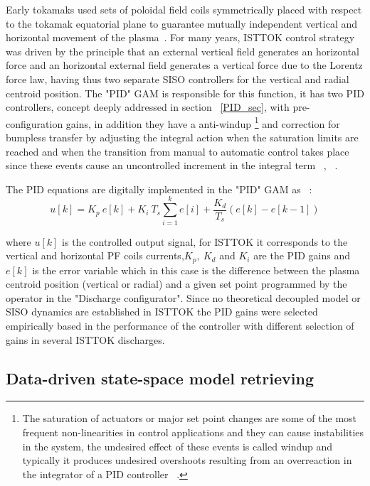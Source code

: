 Early tokamaks used sets of poloidal field coils symmetrically placed with respect to the tokamak equatorial plane to guarantee mutually independent vertical and horizontal movement of the plasma~\cite[Chapter~1]{PirontiBook}. For many years, ISTTOK control strategy was driven by the principle that an external vertical field  generates an horizontal force and an horizontal external field generates a vertical force due to the Lorentz force law, having thus two separate SISO controllers for the vertical and radial centroid position. The "PID" GAM is responsible for this function, it has two PID  controllers, concept deeply addressed in section ~\ref{PID_sec},   with pre-configuration gains, in addition they have a   anti-windup \footnote{The saturation of actuators or major set point changes are some  of the most frequent non-linearities in control applications and they can cause instabilities in the system, the undesired effect of these events is called windup and typically it produces undesired overshoots resulting from an overreaction in the integrator of a PID controller ~\cite[Chapter~1]{Hippe2011}.} and correction for bumpless transfer by adjusting the integral action when the saturation limits are reached and  when the transition from manual to automatic control takes place since these events cause an uncontrolled increment in the integral term  ~\cite[Chapter~3]{Yu2011}, ~\cite{Vrancic1996}. \smallskip  

The PID equations are digitally implemented in the "PID" GAM as ~\cite[Chapter~1]{Yu2011}: 
\begin{equation}
	u[k]=K_p~e[k]+ K_i~T_s\sum_{i=1}^{k}e[i]+\frac{K_d}{T_s}(e[k]-e[k-1])
\end{equation}

\noindent where $u[k]$ is the controlled output signal, for ISTTOK it corresponds to the vertical and horizontal PF coils currents,$K_p,~K_d$ and $K_i$ are the PID gains and $e[k]$ is the error variable which in this case is the difference between the plasma centroid position (vertical or radial) and  a given set point programmed by the operator in the "Discharge configurator".  Since no theoretical decoupled model or SISO dynamics are established in ISTTOK the PID gains were selected empirically based in the performance of the controller with different selection of gains in several ISTTOK discharges.

\subsection{Data-driven state-space model retrieving }

